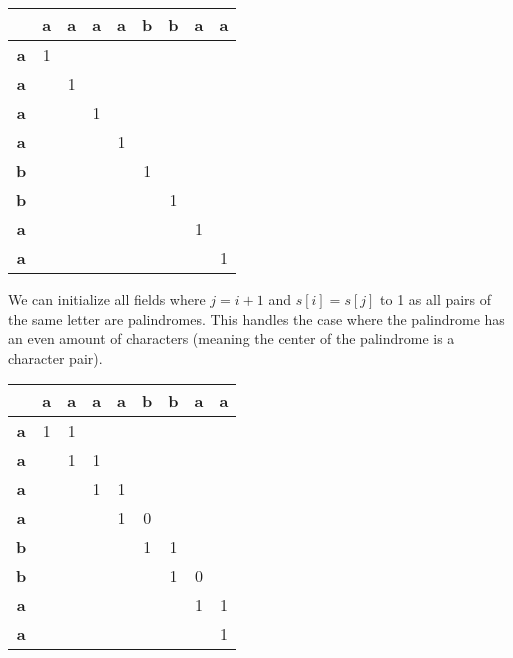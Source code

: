 \begin{table}[htbp]
    \centering
    \begin{tabular}{|c|c|c|c|c|c|c|c|c|}
        \hline
          & \textbf{a} & \textbf{a} & \textbf{a} & \textbf{a} & \textbf{b} & \textbf{b} & \textbf{a} & \textbf{a} \\
        \hline
        \textbf{a} & 1 &  &  &  &  &  &  &  \\
        \hline
        \textbf{a} &  & 1 &  &  &  &  &  &  \\
        \hline
        \textbf{a} &  &  & 1 &  &  &  &  &  \\
        \hline
        \textbf{a} &  &  &  & 1 &  &  &  &  \\
        \hline
        \textbf{b} &  &  &  &  & 1 &  &  &  \\
        \hline
        \textbf{b} &  &  &  &  &  & 1 &  &  \\
        \hline
        \textbf{a} &  &  &  &  &  &  & 1 &  \\
        \hline
        \textbf{a} &  &  &  &  &  &  &  & 1 \\
        \hline
    \end{tabular}
\end{table}

We can initialize all fields where $j = i+1$ and $s[i] = s[j]$ to 1 as all pairs of the same letter are palindromes.
This handles the case where the palindrome has an even amount of characters (meaning the center of the palindrome is a character pair).


\begin{table}[htbp]
    \centering
    \begin{tabular}{|c|c|c|c|c|c|c|c|c|}
        \hline
          & \textbf{a} & \textbf{a} & \textbf{a} & \textbf{a} & \textbf{b} & \textbf{b} & \textbf{a} & \textbf{a} \\
        \hline
        \textbf{a} & 1 & 1 &  &  &  &  &  &  \\
        \hline
        \textbf{a} &  & 1 & 1 &  &  &  &  &  \\
        \hline
        \textbf{a} &  &  & 1 & 1 &  &  &  &  \\
        \hline
        \textbf{a} &  &  &  & 1 & 0 &  &  &  \\
        \hline
        \textbf{b} &  &  &  &  & 1 & 1 &  &  \\
        \hline
        \textbf{b} &  &  &  &  &  & 1 & 0 &  \\
        \hline
        \textbf{a} &  &  &  &  &  &  & 1 & 1 \\
        \hline
        \textbf{a} &  &  &  &  &  &  &  & 1 \\
        \hline
    \end{tabular}
\end{table}


